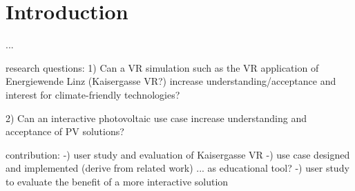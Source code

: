 \documentclass[draft, final]{vutinfth} %
\begin{document}
\tableofcontents %
\mainmatter

\chapter{Introduction}






...

research questions:
1) Can a VR simulation such as the VR application of Energiewende Linz (Kaisergasse VR?) increase understanding/acceptance  and interest for climate-friendly technologies? 

2) Can an interactive photovoltaic use case increase understanding and acceptance of PV solutions?











contribution:
-) user study and evaluation of Kaisergasse VR
-) use case designed and implemented (derive from related work) ... as educational tool?
-) user study to evaluate the benefit of a more interactive solution


\end{document}
